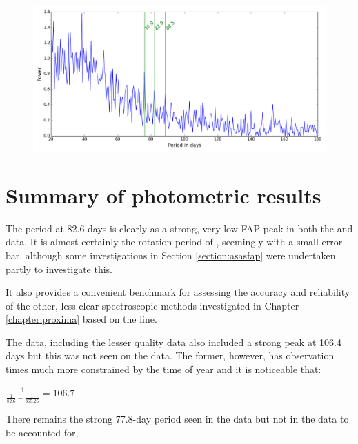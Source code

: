 \begin{figure}[!htbp]
\begin{center}
\includegraphics[scale=0.50]{Figures/hstwinfunc.png} \\
\end{center}
\caption{}
\protect\label{fig:hstwf}
\end{figure}

\section{Summary of photometric results}
\protect\label{section:summphotometric}

The period at 82.6 days is clearly as a strong, very low-FAP peak in both the {\asas} and {\hst} data. It is almost
certainly the rotation period of {\prox}, seemingly with a small error bar, although some investigations in Section
\ref{section:asasfap} were undertaken partly to investigate this.

It also provides a convenient benchmark for assessing the accuracy and reliability of the other, less clear
spectroscopic methods investigated in Chapter \ref{chapter:proxima} based on the {\ha} line.

The {\asas} data, including the lesser quality data also included a strong peak at 106.4 days but this was not seen on
the {\hst} data. The former, however, has observation times much more constrained by the time of year and it is
noticeable that:

\begin{center}

$ \frac{1}{\frac{1}{82.6} - \frac{1}{365.25}} = 106.7 $

\end{center}

There remains the strong 77.8-day period seen in the {\hst} data but not in the {\asas} data to be accounted for,
